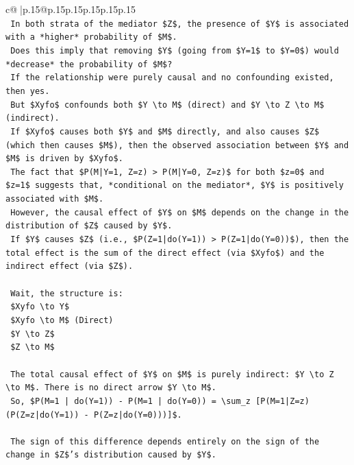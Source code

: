 \documentclass{article}
\begin{document}
{\begin{supertabular}{c@{$\;$}|p{.15\linewidth}@{}p{.15\linewidth}p{.15\linewidth}p{.15\linewidth}p{.15\linewidth}p{.15\linewidth}}
{{{\\ 
\texttt{    In both strata of the mediator \$Z\$, the presence of \$Y\$ is associated with a *higher* probability of \$M\$.} \\
\texttt{    Does this imply that removing \$Y\$ (going from \$Y=1\$ to \$Y=0\$) would *decrease* the probability of \$M\$?} \\
\texttt{    If the relationship were purely causal and no confounding existed, then yes.} \\
\texttt{    But \$Xyfo\$ confounds both \$Y \textbackslash{}to M\$ (direct) and \$Y \textbackslash{}to Z \textbackslash{}to M\$ (indirect).} \\
\texttt{    If \$Xyfo\$ causes both \$Y\$ and \$M\$ directly, and also causes \$Z\$ (which then causes \$M\$), then the observed association between \$Y\$ and \$M\$ is driven by \$Xyfo\$.} \\
\texttt{    The fact that \$P(M|Y=1, Z=z) > P(M|Y=0, Z=z)\$ for both \$z=0\$ and \$z=1\$ suggests that, *conditional on the mediator*, \$Y\$ is positively associated with \$M\$.} \\
\texttt{    However, the causal effect of \$Y\$ on \$M\$ depends on the change in the distribution of \$Z\$ caused by \$Y\$.} \\
\texttt{    If \$Y\$ causes \$Z\$ (i.e., \$P(Z=1|do(Y=1)) > P(Z=1|do(Y=0))\$), then the total effect is the sum of the direct effect (via \$Xyfo\$) and the indirect effect (via \$Z\$).} \\
\\ 
\texttt{    Wait, the structure is:} \\
\texttt{    \$Xyfo \textbackslash{}to Y\$} \\
\texttt{    \$Xyfo \textbackslash{}to M\$ (Direct)} \\
\texttt{    \$Y \textbackslash{}to Z\$} \\
\texttt{    \$Z \textbackslash{}to M\$} \\
\\ 
\texttt{    The total causal effect of \$Y\$ on \$M\$ is purely indirect: \$Y \textbackslash{}to Z \textbackslash{}to M\$. There is no direct arrow \$Y \textbackslash{}to M\$.} \\
\texttt{    So, \$P(M=1 | do(Y=1)) {-} P(M=1 | do(Y=0)) = \textbackslash{}sum\_z {[}P(M=1|Z=z) (P(Z=z|do(Y=1)) {-} P(Z=z|do(Y=0))){]}\$.} \\
\\ 
\texttt{    The sign of this difference depends entirely on the sign of the change in \$Z\$'s distribution caused by \$Y\$.} \\
}}}
\end{supertabular}}
\end{document}

